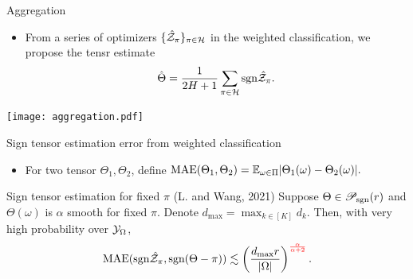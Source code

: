 \documentclass[10pt, mathserif]{beamer} %
\theoremstyle{definition}
\theoremstyle{plain}
\def\caliP{\mathscr{P}_{\textup{sgn}}}
\begin{document}
\begin{frame}{Aggregation}
    \begin{itemize}
    \item From a series of optimizers $\{\hat{\mathcal{Z}}_\pi\}_{\pi\in\mathcal{H}}$ in the weighted classification, we propose the tensr estimate 
    \begin{align}
        \hat\Theta = {1\over 2H+1}\sum_{\pi\in\mathcal{H}}\text{sgn}\hat {\mathcal{Z}}_\pi.
    \end{align}
    \end{itemize}
     \begin{center}
    \texttt{[image: aggregation.pdf]}
    \end{center}
\end{frame}


\begin{frame}{Sign tensor estimation error from weighted classification}
\begin{itemize}
\item For two tensor $\Theta_1,\Theta_2$, define $\textup{MAE}(\Theta_1,\Theta_2) = \mathbb{E}_{\omega\in\Pi}|\Theta_1(\omega)-\Theta_2(\omega)|.$
\end{itemize}
    \begin{block}{Sign tensor estimation for fixed $\pi$ (L. and Wang, 2021)}
    Suppose $\Theta\in\caliP(r)$ and  $\Theta(\omega)$ is $\alpha$ smooth for fixed $\pi$.  Denote $d_{\max}=\max_{k\in[K]} d_k$. Then, with very high probability over $\mathcal{Y}_\Omega$, 
\begin{align}
\textup{MAE}(\text{sgn}\hat {\mathcal{Z}}_\pi, \text{sgn}(\Theta-\pi)) \lesssim  \left({d_{\max} r\over |\Omega|}\right)^{\color{red}\alpha\over \alpha+2}.
\end{align}
    \end{block}
\end{frame}
\end{document}
